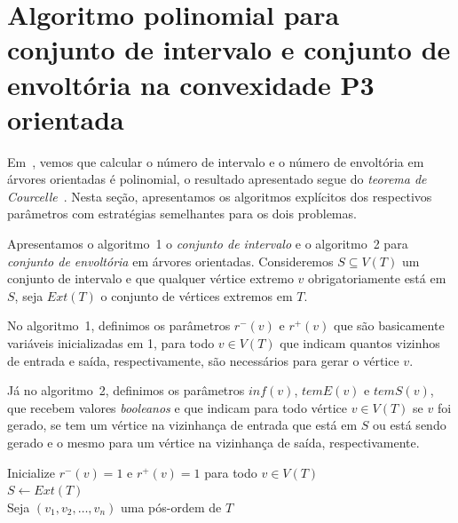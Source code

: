 \chapter{Algoritmo polinomial para conjunto de intervalo e conjunto de envoltória na convexidade P3 orientada}\label{4-algoritmos}

Em~\cite{Medeiros2024Convexidade}, vemos que calcular o número de intervalo e o número de envoltória em árvores orientadas é polinomial, o resultado apresentado segue do \emph{teorema de Courcelle}~\cite{courcelle2012graph}. Nesta seção, apresentamos os algoritmos explícitos dos respectivos parâmetros com estratégias semelhantes para os dois problemas.

Apresentamos o algoritmo~1 o \emph{conjunto de intervalo} e o algoritmo~2 para \emph{conjunto de envoltória} em árvores orientadas. Consideremos $S \subseteq V(T)$ um conjunto de intervalo e que qualquer vértice extremo $v$ obrigatoriamente está em $S$, seja $Ext(T)$ o conjunto de vértices extremos em $T$.

No algoritmo~1, definimos os parâmetros $r^-(v)$ e $r^+(v)$ que são basicamente variáveis inicializadas em 1, para todo $v \in V(T)$ que indicam quantos vizinhos de entrada e saída, respectivamente, são necessários para gerar o vértice $v$.

Já no algoritmo~2, definimos os parâmetros $inf(v)$, $temE(v)$ e $temS(v)$, que recebem valores \emph{booleanos} e que indicam para todo vértice $v \in V(T)$ se $v$ foi gerado, se tem um vértice na vizinhança de entrada que está em $S$ ou está sendo gerado e o mesmo para um vértice na vizinhança de saída, respectivamente.

\begin{algorithm}[ht]
  \SetAlgoLined
  Inicialize $r^-(v) = 1$ e $r^+(v) = 1$ para todo $v \in V(T)$\\
  $S \leftarrow Ext(T)$\\
  Seja $(v_1, v_2, \ldots, v_n)$ uma pós-ordem de $T$\\
  \caption{Conjunto de Intervalo em Árvores orientadas}\label{alg1}
\end{algorithm}


